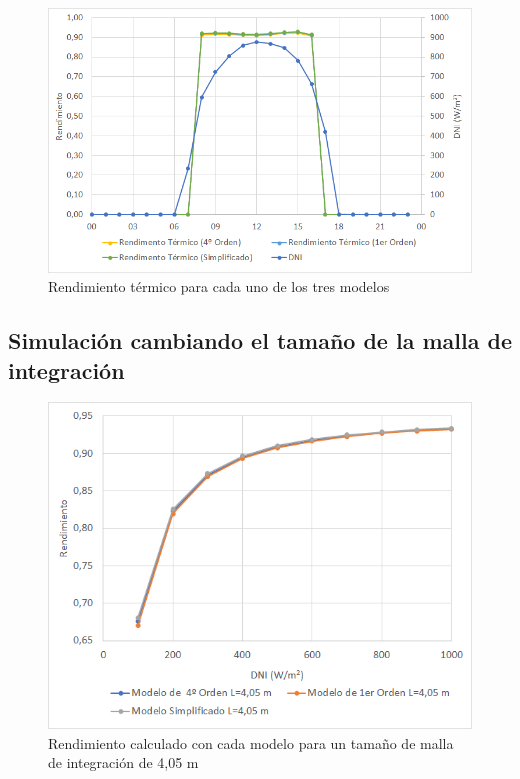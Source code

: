 \begin{figure}[!h]
\includegraphics[width=0.9\linewidth]{images/rendimientos_modelos.png}
\caption{Rendimiento térmico para cada uno de los tres modelos} 
\label{fig:rendimientos_modelos}
\end{figure}

\subsection{Simulación cambiando el tamaño de la malla de integración}
\label{mallaintegracion}


\begin{figure}[!h]
\includegraphics[width=0.9\linewidth]{images/malla0405.png}
\caption{Rendimiento calculado con cada modelo para un tamaño de malla de integración de 4,05 m} 
\label{fig:malla0405}
\end{figure}

